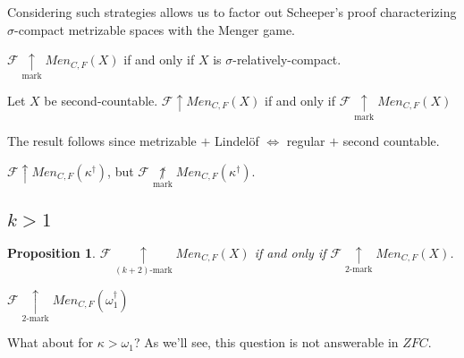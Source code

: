\documentclass{beamer}
\newtheorem{proposition}[theorem]{Proposition}
\theoremstyle{definition}
\newcommand{\win}{\uparrow}
\newcommand{\markwin}{\underset{\text{mark}}{\uparrow}}
\newcommand{\kmarkwin}[1]{\underset{#1\text{-mark}}{\uparrow}}
\newcommand{\notmarkwin}{\underset{\text{mark}}{\not\uparrow}}
\newcommand{\oneptlind}[1]{#1^\dagger} %
\newcommand{\menGame}[1]{Men_{C,F}\left({#1}\right)}
\newcommand{\<}{\langle}
\renewcommand{\>}{\rangle}
\newcommand{\pl}[1]{\mathscr{#1}}
\begin{document}
\begin{frame}\small
  Considering such strategies allows us to factor out Scheeper's proof
  characterizing \(\sigma\)-compact metrizable spaces with the Menger
  game.

  \pause

  \begin{lemma}
    \(\pl F\markwin\menGame X\) if and only if \(X\) is
    \(\sigma\)-relatively-compact.
  \end{lemma}

  \pause

  \begin{lemma}
    Let \(X\) be second-countable.
    \(\pl F\win\menGame X\) if and only if
    \(\pl F\markwin\menGame X\)
  \end{lemma}

  \pause

  The result follows since metrizable \(+\) Lindel\"of
  \(\Leftrightarrow\) regular \(+\) second countable.

  \pause

  \begin{example}
    \(\pl F\win\menGame{\oneptlind\kappa}\), but
    \(\pl F\notmarkwin\menGame{\oneptlind\kappa}\).
  \end{example}
\end{frame}

\subsection{$k>1$}

\begin{frame}
  \begin{proposition}
    \(\pl F\kmarkwin{(k+2)}\menGame{X}\) if and only if
    \(\pl F\kmarkwin{2}\menGame{X}\).
  \end{proposition}

  \pause

  \begin{example}
    \(\pl F\kmarkwin{2}\menGame{\oneptlind\omega_1}\)
  \end{example}

  \vpause

  What about for \(\kappa>\omega_1\)? As we'll see, this question
  is not answerable in \(ZFC\).
\end{frame}

\end{document}

